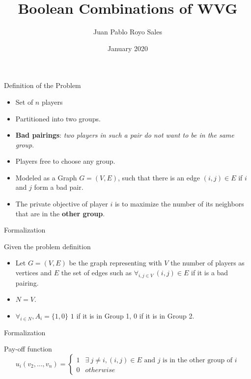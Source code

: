 \documentclass{beamer}
\title{Boolean Combinations of WVG}
\author{Juan Pablo Royo Sales}
\institute{Universitat Politècnica de Catalunya}
\date{January 2020}
\begin{document}
\begin{frame}
\titlepage
\end{frame}

\begin{frame}[fragile]{Definition of the Problem}

  \begin{block}{}
    \begin{itemize}
      \item Set of $n$ players 
      \item Partitioned into two groups. 
      \item \textbf{Bad pairings}: \textit{two players in such a pair do not want to be in the same group}.
      \item Players free to choose any group.
      \item Modeled as a Graph $G = (V,E)$, such that there is an edge $(i, j) \in E$ if $i$ and $j$ form
      a bad pair.
      \item The private objective of player $i$ is to maximize the number of its neighbors that
      are in the \textbf{other group}.
    \end{itemize}
  \end{block}

\end{frame}


\begin{frame}[fragile]{Formalization}
  \begin{block}{Given the problem definition}
    \begin{itemize}
      \item Let $G=(V,E)$ be the graph representing with $V$ the number of players as vertices and $E$ the set of edges such as $\forall_{i,j \in V}\ (i,j) \in E$ if it is a bad pairing.
      \item $N = V$.
      \item $\forall_{i \in N}, A_i = \{1,0\}$ $1$ if it is in Group 1, $0$ if it is in Group 2.
    \end{itemize}
  \end{block}
\end{frame}

\begin{frame}[fragile]{Formalization}
  \begin{block}{Pay-off function}
    \[
u_i(v_2,\dots,v_n) = 
    \begin{cases}
      1 & \exists\ j \neq i, (i,j) \in E \text{ and $j$ is in the other group of $i$} \\
      0 & otherwise 
    \end{cases} 
\]
  \end{block}
\end{frame}
\end{document}
